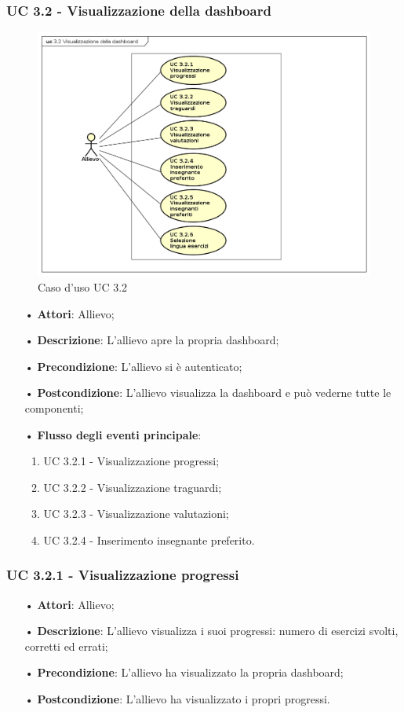 \subsubsection{UC 3.2 - Visualizzazione della dashboard}
\begin{figure}[H]
\centering
\includegraphics[width=17cm]{img/UC32.png} 
\caption{Caso d'uso UC 3.2}\label{fig:32}
\end{figure}
\begin{itemize}
\item[•]\textbf{Attori}: Allievo;
\item[•]\textbf{Descrizione}: L'allievo apre la propria dashboard;
\item[•]\textbf{Precondizione}: L'allievo si è autenticato;
\item[•]\textbf{Postcondizione}: L'allievo visualizza la dashboard e può vederne tutte le componenti;
\item[•]\textbf{Flusso degli eventi principale}:
\begin{enumerate}
\item UC 3.2.1 - Visualizzazione progressi;
\item UC 3.2.2 - Visualizzazione traguardi;
\item UC 3.2.3 - Visualizzazione valutazioni;
\item UC 3.2.4 - Inserimento insegnante preferito.
\end{enumerate}
\end{itemize}

\subsubsection{UC 3.2.1 - Visualizzazione progressi}
\begin{itemize}
\item[•]\textbf{Attori}: Allievo;
\item[•]\textbf{Descrizione}: L'allievo visualizza i suoi progressi: numero di esercizi svolti, corretti ed errati;
\item[•]\textbf{Precondizione}: L'allievo ha visualizzato la propria dashboard;
\item[•]\textbf{Postcondizione}: L'allievo ha visualizzato i propri progressi.
\end{itemize}

